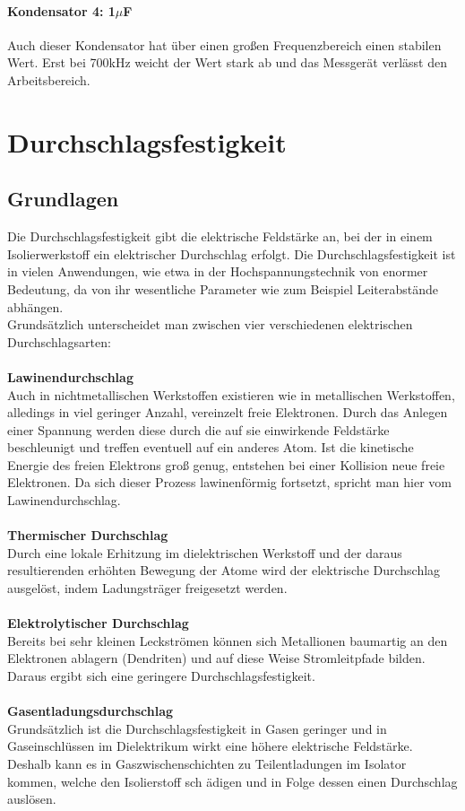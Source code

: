 \documentclass[a4paper,twoside,12pt,DIV=13,BCOR=5mm,numbers=noenddot,cleardoublepage=empty]{scrbook}
\begin{document}
    \subsubsection{Kondensator 4: 1$\mu$F }
    Auch dieser Kondensator hat \"uber einen gro\ss{}en Frequenzbereich einen stabilen Wert. Erst bei 700kHz weicht 
    der Wert stark ab und das Messger\"at verl\"asst den Arbeitsbereich.
    \chapter{Durchschlagsfestigkeit}
    \section{Grundlagen}
		Die Durchschlagsfestigkeit gibt die elektrische Feldst\"arke an, bei der in einem Isolierwerkstoff ein elektrischer Durchschlag 	
		erfolgt.
		Die Durchschlagsfestigkeit ist in vielen Anwendungen, wie etwa in der Hochspannungstechnik von enormer Bedeutung, da von ihr 		
		wesentliche Parameter wie zum Beispiel Leiterabst\"ande abh\"angen.
		\\
		Grunds\"atzlich unterscheidet man zwischen vier verschiedenen elektrischen Durchschlagsarten:
		\\
		\\
		\textbf{Lawinendurchschlag}
			\\
			Auch in nichtmetallischen Werkstoffen existieren wie in metallischen 
			Werkstoffen, alledings in viel geringer Anzahl,  vereinzelt freie Elektronen.
			Durch das Anlegen einer Spannung werden diese durch die auf sie einwirkende Feldst\"arke 
			beschleunigt und treffen eventuell auf ein anderes Atom.
			Ist die kinetische Energie des freien Elektrons gro\ss{} genug,
			entstehen bei einer Kollision neue freie Elektronen.
			Da sich dieser Prozess lawinenf\"ormig fortsetzt, spricht man hier vom Lawinendurchschlag.
			\\
			\\
		\textbf{Thermischer Durchschlag}
			\\
			Durch eine lokale Erhitzung im dielektrischen Werkstoff und der daraus resultierenden erh\"ohten Bewegung der Atome wird der
			elektrische Durchschlag ausgel\"ost, indem Ladungstr\"ager 
			freigesetzt werden.
			\\
			\\
		\textbf{Elektrolytischer Durchschlag}
			\\
			Bereits bei sehr kleinen Leckstr\"omen k\"onnen sich Metallionen baumartig an den Elektronen ablagern (Dendriten) und auf diese Weise 
			Stromleitpfade bilden. Daraus ergibt sich eine geringere Durchschlagsfestigkeit.
			\\
			\\
		\textbf{Gasentladungsdurchschlag}
			\\
			Grunds\"atzlich ist die Durchschlagsfestigkeit in Gasen geringer und in Gaseinschl\"ussen im Dielektrikum wirkt eine h\"ohere 
			elektrische Feldst\"arke. Deshalb kann es in Gaszwischenschichten zu Teilentladungen im Isolator kommen, welche den Isolierstoff sch
			\"adigen und in Folge dessen einen Durchschlag ausl\"osen.
		
\end{document}
